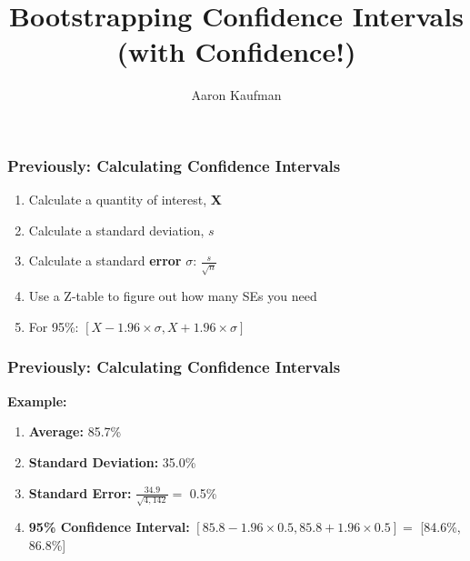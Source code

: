 \documentclass[12pt,aspectratio=169]{beamer}
\title{Bootstrapping Confidence Intervals \\ (with Confidence!)}
\date{}
\author{Aaron Kaufman}
\institute{November 16, 2018}
\begin{document}
{
\maketitle
}


\begin{frame}
\frametitle{Previously: Calculating Confidence Intervals}



\begin{enumerate}
	\item<5->{Calculate a quantity of interest, \textbf{X}}
	\item<6->{Calculate a standard deviation, \textbf{$s$}}
	\item<7->{Calculate a standard \textbf{error} \textbf{$\sigma$}: $\frac{s}{\sqrt{n}}$} 
	\item<8->{Use a Z-table to figure out how many SEs you need \uncover<9->{(1.96 for 95\%, 2.58 for 99\%)}}
	\item<10->{For 95\%: $[X - 1.96 \times \sigma, X + 1.96 \times \sigma]$}
\end{enumerate}

\end{frame}


\begin{frame}
\frametitle{Previously: Calculating Confidence Intervals}

\textbf{Example: }

\begin{enumerate}
	\item<5->{\textbf{Average:} 85.7\%}
	\item<6->{\textbf{Standard Deviation:} 35.0\%}
	\item<7->{\textbf{Standard Error:} $\frac{34.9}{\sqrt{4,142}} = $ 0.5\%}
	\item<8->{\textbf{95\% Confidence Interval:} $[85.8 - 1.96\times 0.5, 85.8 + 1.96\times 0.5] = $ [84.6\%, 86.8\%]}
\end{enumerate} 


\end{frame}
\end{document}
